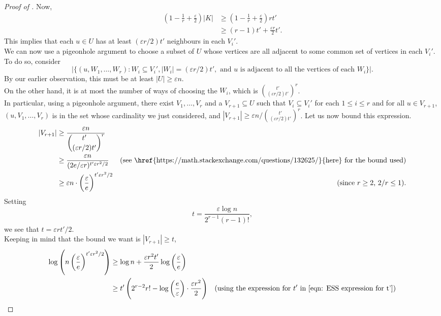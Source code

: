 \documentclass{article}
\begin{document}
\begin{proof}[Proof of ]
				Now,
				\begin{align*}
					\left(1 - \frac{1}{r} + \frac{\varepsilon}{2} \right)|K| &\ge \left(1 - \frac{1}{r} + \frac{\varepsilon}{2} \right) rt' \\
					&\ge (r-1)t' + \frac{\varepsilon r}{2} t'.	
				\end{align*}
				This implies that each $u \in U$ has at least $(\varepsilon r/2)t'$ neighbours in each $V_i'$.\\
				We can now use a pigeonhole argument to choose a subset of $U$ whose vertices are all adjacent to some common set of vertices in each $V_i'$. To do so, consider
				\[ |\{(u, W_1,\ldots,W_r) : W_i \subseteq V_i', |W_i| = (\varepsilon r/2)t',\text{ and $u$ is adjacent to all the vertices of each $W_i$}\}|. \]
				By our earlier observation, this must be at least $|U| \ge \varepsilon n$.\\
				On the other hand, it is at most the number of ways of choosing the $W_i$, which is $\binom{t'}{(\varepsilon r/2)t'}^r$.\\
				In particular, using a pigeonhole argument, there exist $V_1,\ldots,V_r$ and a $V_{r+1}\subseteq U$ such that $V_i \subseteq V_i'$ for each $1\le i\le r$ and for all $u \in V_{r+1}$, $(u,V_1,\ldots,V_r)$ is in the set whose cardinality we just considered, and $|V_{r+1}| \ge \varepsilon n / \binom{t'}{(\varepsilon r/2)t'}^r$. Let us now bound this expression.
				\begin{align*}
					|V_{r+1}| &\ge \dfrac{\varepsilon n}{\dbinom{t'}{(\varepsilon r/2)t'}^r} \\
					&\ge \frac{\varepsilon n}{ (2e/\varepsilon r)^{t'\varepsilon r^2/2}} & \text{(see \href{https://math.stackexchange.com/questions/132625/}{here} for the bound used)} \\
					&\ge \varepsilon n\cdot\left(\frac{\varepsilon}{e}\right)^{t'\varepsilon r^2/2} & (\text{since $r \ge 2$, $2/r \le 1$}).
				\end{align*}
				Setting
				\[ t = \frac{\varepsilon\log n}{2^{r-1}(r-1)!}, \]
				we see that $t = \varepsilon rt'/2$.\\
				Keeping in mind that the bound we want is $|V_{r+1}| \ge t$,
				\begin{align*}
					\log \left(n \left(\frac{\varepsilon}{e}\right)^{t' \varepsilon r^2/2}\right) &\ge \log n + \frac{\varepsilon r^2 t'}{2} \log\left(\frac{\varepsilon}{e}\right) \\
					&\ge t' \left( 2^{r-2} r! - \log\left(\frac{e}{\varepsilon}\right) \cdot \frac{\varepsilon r^2}{2} \right) & \text{(using the expression for $t'$ in \eqref{eqn: ESS expression for t'})} \\

\end{align*}
\end{proof}
\end{document}
